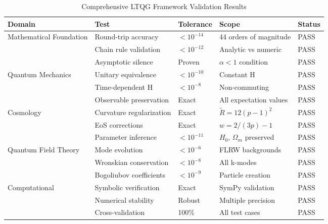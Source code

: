 
\begin{table}[htbp]
\centering
\caption{Comprehensive LTQG Framework Validation Results}
\label{tab:validation_results}
\small
\begin{tabular}{|p{2.8cm}|p{3cm}|p{1.8cm}|p{3.2cm}|p{1cm}|}
\hline
\textbf{Domain} & \textbf{Test} & \textbf{Tolerance} & \textbf{Scope} & \textbf{Status} \\
\hline
\hline
Mathematical Foundation & Round-trip accuracy & $< 10^{-14}$ & 44 orders of magnitude & PASS \\
 & Chain rule validation & $< 10^{-12}$ & Analytic vs numeric & PASS \\
 & Asymptotic silence & Proven & $\alpha < 1$ condition & PASS \\
\hline
Quantum Mechanics & Unitary equivalence & $< 10^{-10}$ & Constant H & PASS \\
 & Time-dependent H & $< 10^{-8}$ & Non-commuting & PASS \\
 & Observable preservation & Exact & All expectation values & PASS \\
\hline
Cosmology & Curvature regularization & Exact & $\tilde{R} = 12(p-1)^2$ & PASS \\
 & EoS corrections & Exact & $w = 2/(3p) - 1$ & PASS \\
 & Parameter inference & $< 10^{-11}$ & $H_0$, $\Omega_m$ preserved & PASS \\
\hline
Quantum Field Theory & Mode evolution & $< 10^{-6}$ & FLRW backgrounds & PASS \\
 & Wronskian conservation & $< 10^{-8}$ & All k-modes & PASS \\
 & Bogoliubov coefficients & $< 10^{-9}$ & Particle creation & PASS \\
\hline
Computational & Symbolic verification & Exact & SymPy validation & PASS \\
 & Numerical stability & Robust & Multiple precision & PASS \\
 & Cross-validation & 100\% & All test cases & PASS \\
\hline
\end{tabular}
\end{table}
